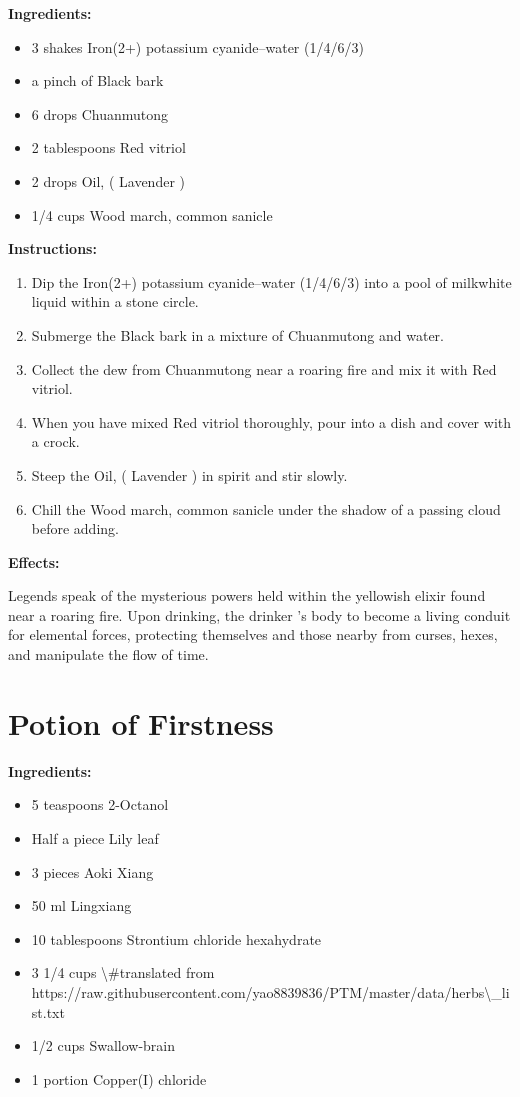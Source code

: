\documentclass{article}
\begin{document}
\textbf{Ingredients:}

\begin{itemize}
  \item 3 shakes Iron(2+) potassium cyanide--water (1/4/6/3)
  \item a pinch of Black bark
  \item 6 drops Chuanmutong
  \item 2 tablespoons Red vitriol
  \item 2 drops Oil, ( Lavender )
  \item 1/4 cups Wood march, common sanicle
\end{itemize}

\textbf{Instructions:}

\begin{enumerate}
  \item Dip the Iron(2+) potassium cyanide--water (1/4/6/3) into a pool of milkwhite liquid within a stone circle.
  \item Submerge the Black bark in a mixture of Chuanmutong and water.
  \item Collect the dew from Chuanmutong near a roaring fire and mix it with Red vitriol.
  \item When you have mixed Red vitriol thoroughly, pour into a dish and cover with a crock.
  \item Steep the Oil, ( Lavender ) in spirit and stir slowly.
  \item Chill the Wood march, common sanicle under the shadow of a passing cloud before adding.
\end{enumerate}

\textbf{Effects:}

Legends speak of the mysterious powers held within the yellowish elixir found near a roaring fire. Upon drinking, the drinker 's body to become a living conduit for elemental forces, protecting themselves and those nearby from curses, hexes, and manipulate the flow of time.

\newpage
\section*{Potion of Firstness}

\textbf{Ingredients:}

\begin{itemize}
  \item 5 teaspoons 2-Octanol
  \item Half a piece Lily leaf
  \item 3 pieces Aoki Xiang
  \item 50 ml Lingxiang
  \item 10 tablespoons Strontium chloride hexahydrate
  \item 3 1/4 cups \textbackslash{}#translated from https://raw.githubusercontent.com/yao8839836/PTM/master/data/herbs\textbackslash{}_list.txt
  \item 1/2 cups Swallow-brain
  \item 1 portion Copper(I) chloride
\end{itemize}
\end{document}

